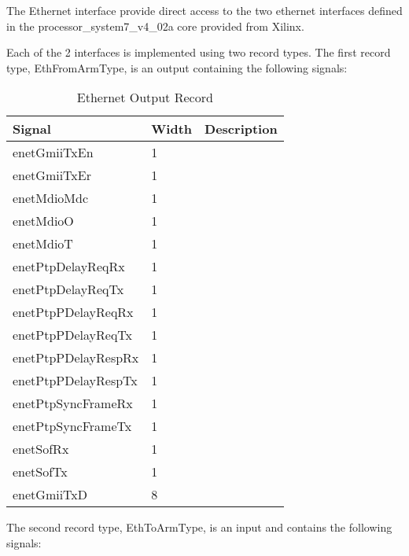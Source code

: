 \documentclass[11pt]{article}
\begin{document}
The Ethernet interface provide direct access to the two ethernet interfaces defined in the processor\_system7\_v4\_02a core provided from Xilinx. 

Each of the 2 interfaces is implemented using two record types. The first record type, EthFromArmType, is an output containing the following signals:

\begin{table}[H]
\small
\centering
   \begin{tabular}{| l | l | l | }
      \hline \textbf{Signal} & \textbf{Width}  & \textbf{Description} \\
      \hline enetGmiiTxEn        & 1         & \\
      \hline enetGmiiTxEr        & 1         & \\
      \hline enetMdioMdc         & 1         & \\
      \hline enetMdioO           & 1         & \\
      \hline enetMdioT           & 1         & \\
      \hline enetPtpDelayReqRx   & 1         & \\
      \hline enetPtpDelayReqTx   & 1         & \\
      \hline enetPtpPDelayReqRx  & 1         & \\
      \hline enetPtpPDelayReqTx  & 1         & \\
      \hline enetPtpPDelayRespRx & 1         & \\
      \hline enetPtpPDelayRespTx & 1         & \\
      \hline enetPtpSyncFrameRx  & 1         & \\
      \hline enetPtpSyncFrameTx  & 1         & \\
      \hline enetSofRx           & 1         & \\
      \hline enetSofTx           & 1         & \\
      \hline enetGmiiTxD         & 8         & \\
      \hline
   \end{tabular}
   \caption{Ethernet Output Record}
\end{table}

The second record type, EthToArmType, is an input and contains the following signals:
\end{document}
